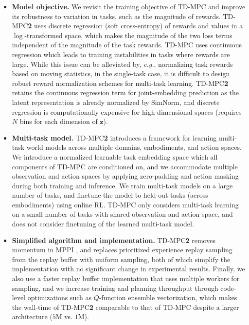 \documentclass{article}
\begin{document}
\begin{itemize}
    \item \textbf{Model objective.} We revisit the training objective of TD-MPC and improve its robustness to variation in tasks, such as the magnitude of rewards. TD-MPC\textbf{2} uses discrete regression (soft cross-entropy) of rewards and values in a $\log$-transformed space, which makes the magnitude of the two loss terms independent of the magnitude of the task rewards. TD-MPC uses continuous regression which leads to training instabilities in tasks where rewards are large. While this issue can be alleviated by, \emph{e.g.}, normalizing task rewards based on moving statistics, in the single-task case, it is difficult to design robust reward normalization schemes for multi-task learning. TD-MPC\textbf{2} retains the continuous regression term for joint-embedding prediction as the latent representation is already normalized by SimNorm, and discrete regression is computationally expensive for high-dimensional spaces (requires $N$ bins for each dimension of $\mathbf{z}$).
    \item \textbf{Multi-task model.} TD-MPC\textbf{2} introduces a framework for learning multi-task world models across multiple domains, embodiments, and action spaces. We introduce a normalized learnable task embedding space which all components of TD-MPC are conditioned on, and we accommodate multiple observation and action spaces by applying zero-padding and action masking during both training and inference. We train multi-task models on a large number of tasks, and finetune the model to held-out tasks (across embodiments) using online RL. TD-MPC only considers multi-task learning on a small number of tasks with shared observation and action space, and does not consider finetuning of the learned multi-task model.
    \item \textbf{Simplified algorithm and implementation.} TD-MPC\textbf{2} removes momentum in MPPI \citep{Williams2015ModelPP}, and replaces prioritized experience replay sampling from the replay buffer with uniform sampling, both of which simplify the implementation with no significant change in experimental results. Finally, we also use a faster replay buffer implementation that uses multiple workers for sampling, and we increase training and planning throughput through code-level optimizations such as $Q$-function ensemble vectorization, which makes the wall-time of TD-MPC\textbf{2} comparable to that of TD-MPC despite a larger architecture ($5$M vs. $1$M).
\end{itemize}
\end{document}
